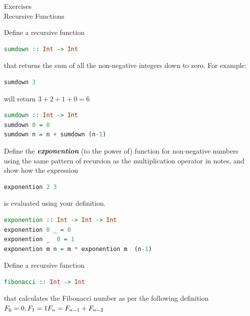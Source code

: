 \documentclass{article}
\newcommand\ExTitle{Recursive Functions}
\newcommand\fullExTitle{Exercises\\ \ExTitle }
\begin{document}
\begin{Huge}
	\begin{center}
	\fullExTitle
	\end{center}
\end{Huge}

\begin{exercise} 
Define a recursive function \\
\begin{lstlisting}[language=Haskell]
  sumdown :: Int -> Int
\end{lstlisting}
that returns the sum of all the non-negative integers down to zero. For example:
\begin{lstlisting}[language=Haskell]
sumdown 3
\end{lstlisting}
will return $ 3 +2+1+0 = 6$
\end{exercise}

\begin{solution}
\begin{lstlisting}[language=Haskell]
sumdown :: Int -> Int 
sumdown 0 = 0
sumdown n = n + sumdown (n-1) 
\end{lstlisting}
\end{solution}


\begin{exercise}
Define the \textbf{\textit{exponention}} (to the power of) function for non-negative numbers using the same pattern of recursion as the multiplication operator in notes, and show how the expression 
\begin{lstlisting}[language=Haskell]
  exponention 2 3
\end{lstlisting}
is evaluated using your definition.
\end{exercise}

\begin{solution}
\begin{lstlisting}[language=Haskell]
exponention :: Int -> Int -> Int
exponention 0 _ = 0
exponention _  0 = 1
exponention m n = m * exponention m  (n-1)
\end{lstlisting}
\end{solution}

\pagebreak
\begin{exercise}

Define a recursive function \\
\begin{lstlisting}[language=Haskell]
fibonacci :: Int -> Int
\end{lstlisting}
that calculates the Fibonacci number as per the following definition \\
$
F_{0} = 0, F_{1} = 1 \\
F_{n} = F_{n-1} + F_{n-2}
$

\end{exercise}
\end{document}
